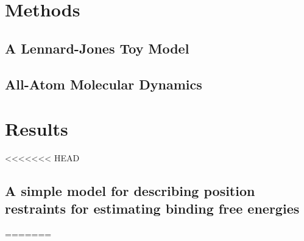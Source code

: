\documentclass[%
 aip,
rsi,%
 amsmath,amssymb,
 reprint,%
]{revtex4-1}
\begin{document}



\section*{Methods}

\subsection{A Lennard-Jones Toy Model}

\subsection{All-Atom Molecular Dynamics}



\section*{Results}

<<<<<<< HEAD
\subsection*{A simple model for describing position restraints for estimating binding free energies}
=======
\end{document}
